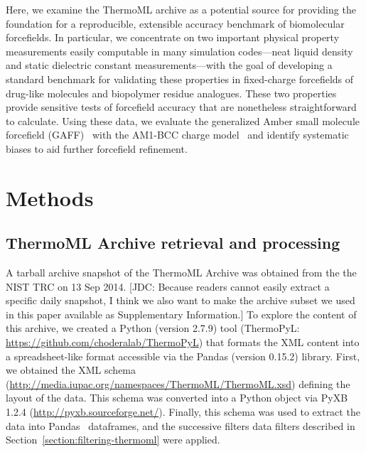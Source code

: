 \documentclass[aps,pre,twocolumn,nofootinbib,superscriptaddress,linenumbers]{revtex4-1}
\begin{document}
Here, we examine the ThermoML archive as a potential source for providing the foundation for a reproducible, extensible accuracy benchmark of biomolecular forcefields.
In particular, we concentrate on two important physical property measurements easily computable in many simulation codes---neat liquid density and static dielectric constant measurements---with the goal of developing a standard benchmark for validating these properties in fixed-charge forcefields of drug-like molecules and biopolymer residue analogues.  
These two properties provide sensitive tests of forcefield accuracy that are nonetheless straightforward to calculate.  
Using these data, we evaluate the generalized Amber small molecule forcefield (GAFF)~\cite{gaff,gaff2} with the AM1-BCC charge model~\cite{am1bcc1,am1bcc2} and identify systematic biases to aid further forcefield refinement.





\section{Methods}
\label{section:methods}

\subsection{ThermoML Archive retrieval and processing}
\label{section:thermoml-archive-retrieval}

A tarball archive snapshot of the ThermoML Archive was obtained from the the NIST TRC on 13 Sep 2014.
{\color{red}[JDC: Because readers cannot easily extract a specific daily snapshot, I think we also want to make the archive subset we used in this paper available as Supplementary Information.]}
To explore the content of this archive, we created a Python (version 2.7.9) tool (ThermoPyL: \url{https://github.com/choderalab/ThermoPyL}) that formats the XML content into a spreadsheet-like format accessible via the Pandas (version 0.15.2) library.  
First, we obtained the XML schema (\url{http://media.iupac.org/namespaces/ThermoML/ThermoML.xsd}) defining the layout of the data.
This schema was converted into a Python object via PyXB 1.2.4 (\url{http://pyxb.sourceforge.net/}).
Finally, this schema was used to extract the data into Pandas~\cite{pandas} dataframes, and the successive filters data filters described in Section~\ref{section:filtering-thermoml} were applied.  
\end{document}
